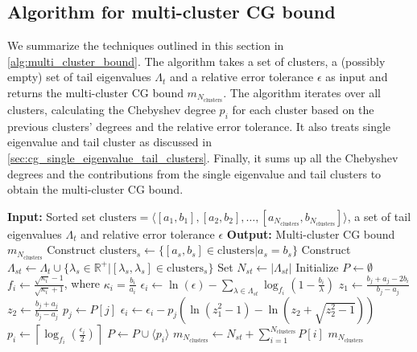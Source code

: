 \subsection{Algorithm for multi-cluster CG bound}\label{sec:cg_multi_cluster_bound_algorithm}
We summarize the techniques outlined in this section in \cref{alg:multi_cluster_bound}. The algorithm takes a set of clusters, a (possibly empty) set of tail eigenvalues $\Lambda_t$ and a relative error tolerance $\epsilon$ as input and returns the multi-cluster CG bound $m_{N_{\text{clusters}}}$. The algorithm iterates over all clusters, calculating the Chebyshev degree $p_i$ for each cluster based on the previous clusters' degrees and the relative error tolerance. It also treats single eigenvalue and tail cluster as discussed in \cref{sec:cg_single_eigenvalue_tail_clusters}. Finally, it sums up all the Chebyshev degrees and the contributions from the single eigenvalue and tail clusters to obtain the multi-cluster CG bound.
\begin{algorithm}[H]
    \caption{$\operatorname{MultiClusterCGIterationBound}(\text{clusters}, \Lambda_t, \epsilon)$}
    \begin{algorithmic}[1]
        \State \textbf{Input:} Sorted set $\text{clusters} = \langle[a_1, b_1], [a_2, b_2], \ldots, [a_{N_{\text{clusters}}}, b_{N_{\text{clusters}}}]\rangle$, a set of tail eigenvalues $\Lambda_t$ and relative error tolerance $\epsilon$
        \State \textbf{Output:} Multi-cluster CG bound $m_{N_{\text{clusters}}}$
        \State Construct $\text{clusters}_s \gets \{[a_s, b_s] \in \text{clusters}|a_s=b_s\}$
        \State Construct $\Lambda_{st} \gets \Lambda_t \cup \{\lambda_s\in\mathbb{R}^+|[\lambda_s, \lambda_s] \in \text{clusters}_s\}$
        \State Set $N_{st} \gets |\Lambda_{st}|$
        \State Initialize $P \gets \emptyset$
        \State $f_i \gets \frac{\sqrt{\kappa_i} - 1}{\sqrt{\kappa_i} + 1}$, where $\kappa_i = \frac{b_i}{a_i}$
        \State $\epsilon_i \gets \ln(\epsilon) - \sum_{\lambda\in\Lambda_{st}} \log_{f_i}\left(1-\frac{b_i}{\lambda}\right)$
         
        \State $z_1 \gets \frac{b_j + a_j - 2b_i}{b_j - a_j}$
        \State $z_2 \gets \frac{b_j + a_j}{b_j - a_j}$
        \State $p_j \gets P[j]$
        \State $\epsilon_i \gets \epsilon_i - p_j \left(\ln(z_1^2 -1) - \ln\left(z_2 + \sqrt{z_2^2 -1}\right)\right)$
        \EndFor
        \State $p_i \gets \left\lceil\log_{f_i}\left(\frac{\epsilon_i}{2}\right)\right\rceil$
        \State $P \gets P \cup \langle p_i \rangle$
        \EndFor
        \State $m_{N_{\text{clusters}}} \gets N_{st} + \sum_{i=1}^{N_{\text{clusters}}} P[i]$
        \State \Return $m_{N_{\text{clusters}}}$
    \end{algorithmic}
    \label{alg:multi_cluster_bound}
\end{algorithm}

